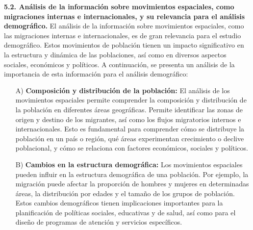 \documentclass[8pt,a4paper]{beamer}
\begin{document}
{\begin{frame}{}
\begin{block}{\textbf{5.2. Análisis de la información sobre movimientos espaciales, como migraciones internas e internacionales, y su relevancia para el análisis demográfico.}}
\justifying
El análisis de la información sobre movimientos espaciales, como las migraciones internas e internacionales, es de gran relevancia para el estudio demográfico. Estos movimientos de población tienen un impacto significativo en la estructura y dinámica de las poblaciones, así como en diversos aspectos sociales, económicos y políticos. A continuación, se presenta un análisis de la importancia de esta información para el análisis demográfico:
\begin{enumerate}
\justifying
\item[A)] \textbf{Composición y distribución de la población:} El análisis de los movimientos espaciales permite comprender la composición y distribución de la población en diferentes áreas geográficas. Permite identificar las zonas de origen y destino de los migrantes, así como los flujos migratorios internos e internacionales. Esto es fundamental para comprender cómo se distribuye la población en un país o región, qué áreas experimentan crecimiento o declive poblacional, y cómo se relaciona con factores económicos, sociales y políticos.

\end{enumerate}
\end{block}
\end{frame}


\begin{frame}{}
\begin{block}{}
\justifying

\begin{enumerate}
\justifying

\item[B)] \textbf{Cambios en la estructura demográfica:} Los movimientos espaciales pueden influir en la estructura demográfica de una población. Por ejemplo, la migración puede afectar la proporción de hombres y mujeres en determinadas áreas, la distribución por edades y el tamaño de los grupos de población. Estos cambios demográficos tienen implicaciones importantes para la planificación de políticas sociales, educativas y de salud, así como para el diseño de programas de atención y servicios específicos.


\end{enumerate}
\end{block}
\end{frame}}
\end{document}
